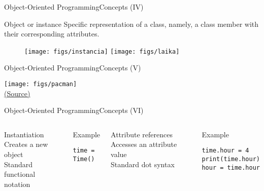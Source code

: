\documentclass[10pt,compress]{beamer} %
\begin{document}
\begin{frame}{Object-Oriented Programming}{Concepts (IV)}
	\vfill\begin{block}{Object or instance}
		 Specific representation of a class, namely, a class member with their corresponding attributes.
  	\end{block}	  	
		\begin{figure}
			\texttt{[image: figs/instancia]}\hfill
			\texttt{[image: figs/laika]}
		\end{figure}				
\end{frame}

\begin{frame}[plain]{Object-Oriented Programming}{Concepts (V)}
	\begin{center}
	\texttt{[image: figs/pacman]}\\
	\smallskip
	\tiny{\href{http://blog.sklambert.com/introduction-to-oop-for-game-development/}{(Source)}}
	\end{center}
\end{frame}

\begin{frame}[fragile]{Object-Oriented Programming}{Concepts (VI)}
    \begin{columns}
	   		\begin{block}{Instantiation}
			Creates a new object\\
			Standard functional notation\\
			\bigskip
			\\
	   		\end{block}
	   		\begin{exampleblock}{Example}
\begin{verbatim}
time = Time()
\end{verbatim}
	   		\end{exampleblock}

	   		\begin{block}{Attribute references}
			Accesses an attribute value\\
			Standard dot syntax\\
			\bigskip
			\\
	   		\end{block}
	   		\begin{exampleblock}{Example}
\begin{verbatim}
time.hour = 4
print(time.hour)
hour = time.hour
\end{verbatim}
	   		\end{exampleblock}
	\end{columns}
\end{frame}
\end{document}
